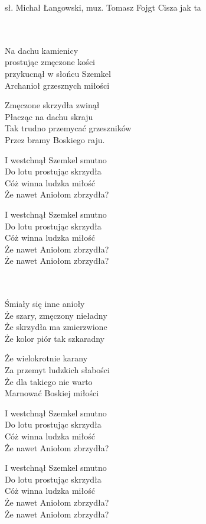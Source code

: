 {sł. Michał Łangowski, muz. Tomasz Fojgt}
{Cisza jak ta}
\begin{text}
~\\
~\\
Na dachu kamienicy\\
prostując zmęczone kości\\
przykucnął w słońcu Szemkel\\
Archanioł grzesznych miłości

Zmęczone skrzydła zwinął\\
Płacząc na dachu skraju\\
Tak trudno przemycać grzeszników\\
Przez bramy Boskiego raju.

\vin I westchnął Szemkel smutno\\
\vin Do lotu prostując skrzydła\\
\vin Cóż winna ludzka miłość\\
\vin Że nawet Aniołom zbrzydła?

\vin I westchnął Szemkel smutno\\
\vin Do lotu prostując skrzydła\\
\vin Cóż winna ludzka miłość\\
\vin Że nawet Aniołom zbrzydła?\\
\vin Że nawet Aniołom zbrzydła?

~\\
~\\
Śmiały się inne anioły\\
Że szary, zmęczony nieładny\\
Że skrzydła ma zmierzwione\\
Że kolor piór tak szkaradny

Że wielokrotnie karany\\
Za przemyt ludzkich słabości\\
Że dla takiego nie warto\\
Marnować Boskiej miłości

\vin I westchnął Szemkel smutno\\
\vin Do lotu prostując skrzydła\\
\vin Cóż winna ludzka miłość\\
\vin Że nawet Aniołom zbrzydła?

\vin I westchnął Szemkel smutno\\
\vin Do lotu prostując skrzydła\\
\vin Cóż winna ludzka miłość\\
\vin Że nawet Aniołom zbrzydła?\\
\vin Że nawet Aniołom zbrzydła?


\end{text}
